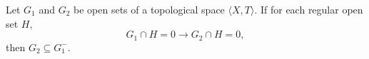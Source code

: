 Let $G_1$ and $G_2$ be open sets of a topological space $\langle X, T \rangle$. If for each regular open set $H$,
$$G_1 \cap H = 0 \rightarrow G_2 \cap H = 0,$$
then $G_2 \subseteq G_1^{-}$.
